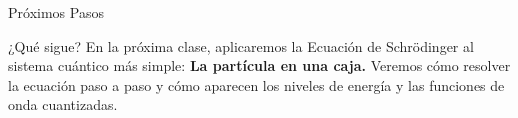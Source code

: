 \documentclass[12pt,aspectratio=169]{beamer}
\begin{document}
\begin{frame}{Próximos Pasos}
	\begin{block}{¿Qué sigue?}
		En la próxima clase, aplicaremos la Ecuación de Schrödinger al sistema cuántico más simple:
		\vspace{1em}
		\centering\textbf{\Large La partícula en una caja.}
		\vspace{1em}
		Veremos cómo resolver la ecuación paso a paso y cómo aparecen los niveles de energía y las funciones de onda cuantizadas.
	\end{block}
\end{frame}	
\end{document}

